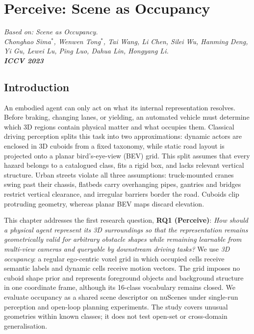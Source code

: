 \chapter{Perceive: Scene as Occupancy}\label{ch:occnet}
\begin{flushright}
\itshape
Based on: Scene as Occupancy.\\
Chonghao Sima$^{*}$, Wenwen Tong$^{*}$, Tai Wang, Li Chen, Silei Wu, Hanming Deng,\\
Yi Gu, Lewei Lu, Ping Luo, Dahua Lin, Hongyang Li.\\
\textbf{ICCV 2023} 
\end{flushright}
\vspace{0.6em}

\section{Introduction}\label{occnet:sec:intro}
\suppressfloats[t]

An embodied agent can only act on what its internal representation resolves. Before braking, changing lanes, or yielding, an automated vehicle must determine which 3D regions contain physical matter and what occupies them. Classical driving perception splits this task into two approximations: dynamic actors are enclosed in 3D cuboids from a fixed taxonomy, while static road layout is projected onto a planar bird's-eye-view (BEV) grid. This split assumes that every hazard belongs to a catalogued class, fits a rigid box, and lacks relevant vertical structure. Urban streets violate all three assumptions: truck-mounted cranes swing past their chassis, flatbeds carry overhanging pipes, gantries and bridges restrict vertical clearance, and irregular barriers border the road. Cuboids clip protruding geometry, whereas planar BEV maps discard elevation.

This chapter addresses the first research question, \textbf{RQ1 (Perceive)}: \emph{How should a physical agent represent its 3D surroundings so that the representation remains geometrically valid for arbitrary obstacle shapes while remaining learnable from multi-view cameras and queryable by downstream driving tasks?} We use \emph{3D occupancy}: a regular ego-centric voxel grid in which occupied cells receive semantic labels and dynamic cells receive motion vectors. The grid imposes no cuboid shape prior and represents foreground objects and background structure in one coordinate frame, although its 16-class vocabulary remains closed. We evaluate occupancy as a shared scene descriptor on nuScenes under single-run perception and open-loop planning experiments. The study covers unusual geometries within known classes; it does not test open-set or cross-domain generalisation.

